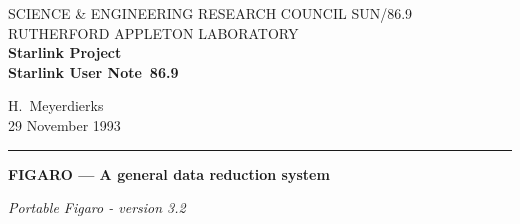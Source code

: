 \pagestyle{myheadings}

\newcommand{\stardoccategory}  {Starlink User Note}
\newcommand{\stardocinitials}  {SUN}
\newcommand{\stardocnumber}    {86.9}
\newcommand{\stardocauthors}   {H.\ Meyerdierks}
\newcommand{\stardocdate}      {29 November 1993}
\newcommand{\stardoctitle}     {FIGARO --- A general data reduction system}

\newcommand{\stardocname}{\stardocinitials /\stardocnumber}
\markright{\stardocname}
\setlength{\textwidth}{160mm}
\setlength{\textheight}{230mm}
\setlength{\topmargin}{-2mm}
\setlength{\oddsidemargin}{0mm}
\setlength{\evensidemargin}{0mm}
\setlength{\parindent}{0mm}
\setlength{\parskip}{\medskipamount}
\setlength{\unitlength}{1mm}



 \onecolumn %
\thispagestyle{empty}
SCIENCE \& ENGINEERING RESEARCH COUNCIL \hfill \stardocname\\
RUTHERFORD APPLETON LABORATORY\\
{\large\bf Starlink Project\\}
{\large\bf \stardoccategory\ \stardocnumber}
\begin{flushright}
\stardocauthors\\
\stardocdate
\end{flushright}
\vspace{-4mm}
\rule{\textwidth}{0.5mm}
\vspace{5mm}
\begin{center}
{\Large\bf \stardoctitle}
\end{center}

\vspace{5mm}

\begin{center}
{\Large\it Portable Figaro - version 3.2}
\end{center}

\vspace{5mm}

\setlength{\parskip}{0mm}
\tableofcontents
\setlength{\parskip}{\medskipamount}
 \twocolumn %

